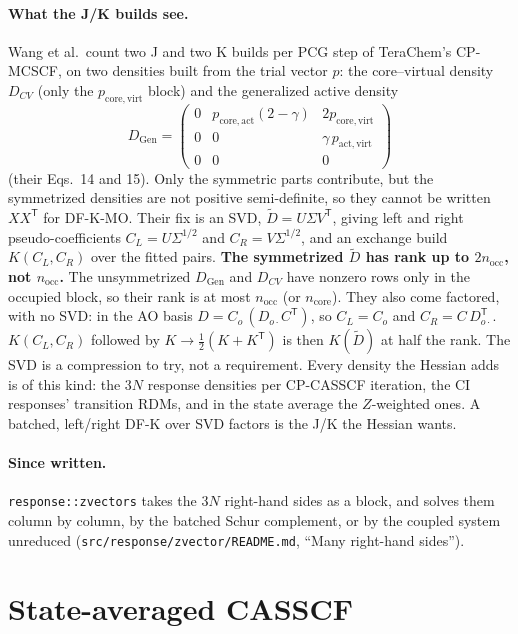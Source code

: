 \documentclass[11pt]{article}
\newcommand{\code}[1]{\texttt{#1}}
\begin{document}
\paragraph{What the J/K builds see.} Wang et al.\ count two J and two K
builds per PCG step of TeraChem's CP-MCSCF, on two densities built from
the trial vector $p$: the core--virtual density $D_{CV}$ (only the
$p_{\mathrm{core,virt}}$ block) and the generalized active density
\[
  D_{\mathrm{Gen}} =
  \begin{pmatrix}
    0 & p_{\mathrm{core,act}}(2 - \gamma) & 2p_{\mathrm{core,virt}}\\
    0 & 0 & \gamma\,p_{\mathrm{act,virt}}\\
    0 & 0 & 0
  \end{pmatrix}
\]
(their Eqs.~14 and 15). Only the symmetric parts contribute, but the
symmetrized densities are not positive semi-definite, so they cannot be
written $XX^{\mathsf T}$ for DF-K-MO. Their fix is an SVD,
$\tilde D = U\Sigma V^{\mathsf T}$, giving left and right pseudo-coefficients
$C_L = U\Sigma^{1/2}$ and $C_R = V\Sigma^{1/2}$, and an exchange build
$K(C_L, C_R)$ over the fitted pairs. \textbf{The symmetrized $\tilde D$ has
rank up to $2n_{\mathrm{occ}}$, not $n_{\mathrm{occ}}$.} The unsymmetrized
$D_{\mathrm{Gen}}$ and $D_{CV}$ have nonzero rows only in the occupied
block, so their rank is at most $n_{\mathrm{occ}}$ (or $n_{\mathrm{core}}$).
They also come factored, with no SVD: in the AO basis $D = C_o\,(D_{o\cdot}
C^{\mathsf T})$, so $C_L = C_o$ and $C_R = C\,D_{o\cdot}^{\mathsf T}$.
$K(C_L, C_R)$ followed by $K \to \frac12(K + K^{\mathsf T})$ is then
$K(\tilde D)$ at half the rank. The SVD is a compression to try, not a
requirement. Every density the Hessian adds is of this kind: the $3N$ response
densities per CP-CASSCF iteration, the CI responses' transition RDMs, and
in the state average the $Z$-weighted ones. A batched, left/right DF-K over
SVD factors is the J/K the Hessian wants.

\paragraph{Since written.} \code{response::zvectors} takes the $3N$
right-hand sides as a block, and solves them column by column, by the
batched Schur complement, or by the coupled system unreduced
(\code{src/response/zvector/README.md}, ``Many right-hand sides'').

\section{State-averaged CASSCF}
\label{sec:sa}
\end{document}
